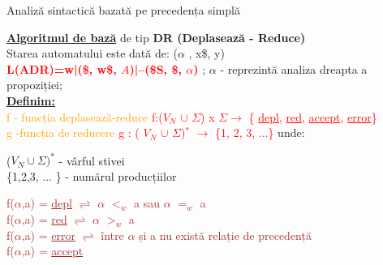 \documentclass[pdf]{beamer}
\begin{document}
\begin{frame}{Analiză sintactică bazată pe precedența simplă}

\textcolor{ballblue}{\textbf{\underline{Algoritmul de bază}}}  de tip \textcolor{ballblue}{\textbf{DR (Deplasează - Reduce)}}\\
Starea automatului este dată de: ($\alpha$ , x\$, y)\\
\textcolor{red}{\textbf{L(ADR)={w|(\$, w\$, $A$)|--(\$S, \$, $\alpha$)}}} ; $\alpha$ - reprezintă analiza dreapta a propoziției;\\
\underline{\textbf{Definim:}}\\
\textcolor{orange}{f - funcția deplasează-reduce} 
\textcolor{red}{f:($V_{N}$ $\cup$ $\Sigma$) x $\Sigma \rightarrow$ \{ \underline{depl}, \underline{red}, \underline{accept}, \underline{error}\}\;}\\
\textcolor{orange}{g -funcția de reducere}
\textcolor{red}{g : ( $V_{N}$ $\cup$ $\Sigma$)$^*$ $\rightarrow$ \{1, 2, 3, ...\}\;} unde:\\
\begin{center}
($V_{N} \cup \Sigma)^*$  -  vârful stivei\;\\
\{1,2,3, ... \} - numărul producțiilor\;\\
\end{center}

\textcolor{brown}{f($\alpha$,a) = \underline{depl} $\rightleftharpoons$ $\alpha$ $<_{w}$ a sau $\alpha$ $=_{w}$ a\; \\
f($\alpha$,a) = \underline{red} $\rightleftharpoons$ $\alpha$ $>_{w}$ a\; \\
f($\alpha$,a) = \underline{error} $\rightleftharpoons$ între $\alpha$ și a nu există relație de precedență\;\\
f($\alpha$,a) = \underline{accept}}
\end{frame}
\end{document}
